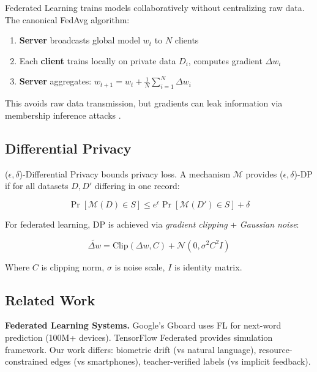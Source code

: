 \documentclass[conference]{IEEEtran}
\begin{document}
Federated Learning \cite{b6} trains models collaboratively without centralizing raw data. The canonical FedAvg algorithm:

\begin{enumerate}
    \item \textbf{Server} broadcasts global model $w_t$ to $N$ clients
    \item Each \textbf{client} trains locally on private data $D_i$, computes gradient $\Delta w_i$
    \item \textbf{Server} aggregates: $w_{t+1} = w_t + \frac{1}{N}\sum_{i=1}^{N} \Delta w_i$
\end{enumerate}

This avoids raw data transmission, but gradients can leak information via membership inference attacks \cite{b10}.

\subsection{Differential Privacy}

($\epsilon, \delta$)-Differential Privacy \cite{b11} bounds privacy loss. A mechanism $\mathcal{M}$ provides ($\epsilon, \delta$)-DP if for all datasets $D, D'$ differing in one record:

\begin{equation}
\Pr[\mathcal{M}(D) \in S] \leq e^{\epsilon} \Pr[\mathcal{M}(D') \in S] + \delta
\end{equation}

For federated learning, DP is achieved via \textit{gradient clipping} + \textit{Gaussian noise}:

\begin{equation}
\tilde{\Delta w} = \text{Clip}(\Delta w, C) + \mathcal{N}(0, \sigma^2 C^2 I)
\label{eq:dp}
\end{equation}

Where $C$ is clipping norm, $\sigma$ is noise scale, $I$ is identity matrix.

\subsection{Related Work}

\textbf{Federated Learning Systems.} Google's Gboard \cite{b8} uses FL for next-word prediction (100M+ devices). TensorFlow Federated \cite{b12} provides simulation framework. Our work differs: biometric drift (vs natural language), resource-constrained edges (vs smartphones), teacher-verified labels (vs implicit feedback).
\end{document}
